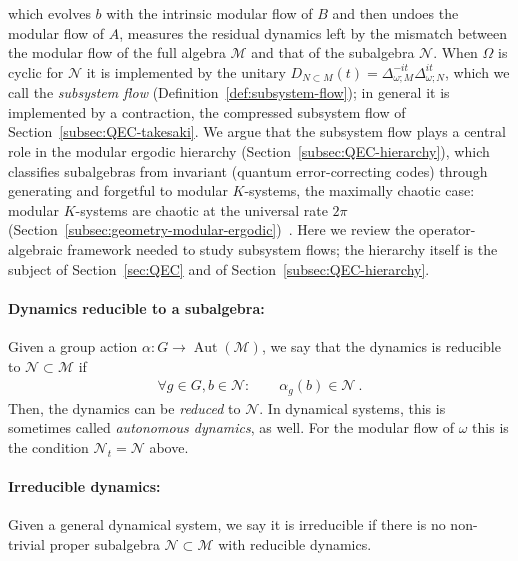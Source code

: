 \documentclass[a4paper,11pt]{article}
\theoremstyle{definition}
\begin{document}
which evolves $b$ with the intrinsic modular flow of $B$ and then undoes the modular flow of $A$, measures the residual dynamics left by the mismatch between the modular flow of the full algebra $\mathcal M$ and that of the subalgebra $\mathcal N$. When $\Omega$ is cyclic for $\mathcal N$ it is implemented by the unitary $D_{N\subset M}(t)=\Delta_{\omega;M}^{-it}\Delta_{\omega;N}^{it}$, which we call the \emph{subsystem flow} (Definition~\ref{def:subsystem-flow}); in general it is implemented by a contraction, the compressed subsystem flow of Section~\ref{subsec:QEC-takesaki}. We argue that the subsystem flow plays a central role in the modular ergodic hierarchy (Section~\ref{subsec:QEC-hierarchy}), which classifies subalgebras from invariant (quantum error-correcting codes) through generating and forgetful to modular $K$-systems, the maximally chaotic case: modular $K$-systems are chaotic at the universal rate $2\pi$ (Section~\ref{subsec:geometry-modular-ergodic})~\cite{OFLLM2024}.
Here we review the operator-algebraic framework needed to study subsystem flows; the hierarchy itself is the subject of Section~\ref{sec:QEC} and of Section~\ref{subsec:QEC-hierarchy}.

\paragraph{Dynamics reducible to a subalgebra:} Given a group action $\alpha:G\to\operatorname{Aut}(\mathcal M)$, we say that the dynamics is reducible to $\mathcal N\subset\mathcal M$ if
\begin{align}
    \forall g\in G,b\in\mathcal N:\qquad \alpha_g(b)\in \mathcal N\ .
\end{align}
Then, the dynamics can be {\it reduced} to $\mathcal N$. In dynamical systems, this is sometimes called {\it autonomous dynamics}, as well. For the modular flow of $\omega$ this is the condition $\mathcal N_t=\mathcal N$ above.

\paragraph{Irreducible dynamics:} Given a general dynamical system, we say it is irreducible if there is no non-trivial proper subalgebra $\mathcal N\subset \mathcal M$ with reducible dynamics.
\end{document}
